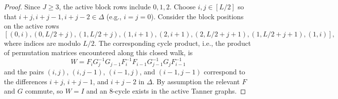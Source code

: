 \documentclass[10pt,a4paper]{amsart}
\begin{document}
\begin{proof}
Since $J\ge 3$, the active block rows include $0,1,2$. Choose $i,j\in[L/2]$ so that $i+j,i+j-1,i+j-2\in\Delta$ (e.g., $i=j=0$). Consider the block positions on the active rows
\[
[(0,i),(0,L/2+j),(1,L/2+j),(1,i+1),(2,i+1),(2,L/2+j+1),(1,L/2+j+1),(1,i)],
\]
where indices are modulo $L/2$. The corresponding cycle product, i.e., the product of permutation matrices encountered along this closed walk, is
\[
W=F_iG_j^{-1}G_{j-1}F_i^{-1}F_{i-1}G_{j-1}^{-1}G_jF_{i-1}^{-1}
\label{eq:8cycle-word-general}
\]
and the pairs $(i,j)$, $(i,j-1)$, $(i-1,j)$, and $(i-1,j-1)$ correspond to the differences $i+j$, $i+j-1$, and $i+j-2$ in $\Delta$. By assumption the relevant $F$ and $G$ commute, so $W=I$ and an 8-cycle exists in the active Tanner graphs.
\end{proof}
\end{document}
